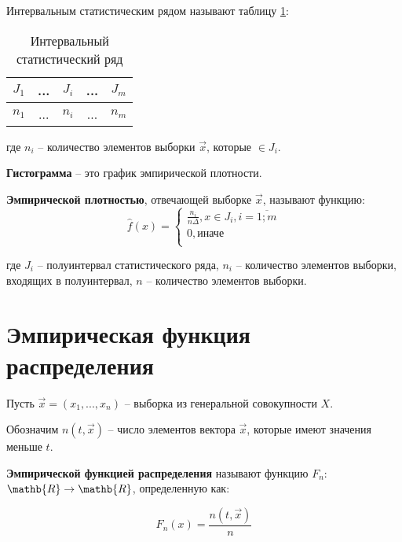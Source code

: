 Интервальным статистическим рядом называют таблицу \ref{table:row1}:

\begin{table}[ht!]
	\captionsetup{singlelinecheck = false, justification=raggedleft}
	\caption{Интервальный статистический ряд}
	\centering
	\label{table:row1}
	\begin{tabular}{|c|c|c|c|c|}
		\hline
		$J_1$ & ... & $J_i$ & ... & $J_m$ \\
		\hline
		$n_1$ & ... & $n_i$ & ... & $n_m$ \\
		\hline
	\end{tabular}
\end{table}

где $n_i$ -- количество элементов выборки $\vec x$, которые $\in J_i$.

\textbf{Гистограмма} -- это график эмпирической плотности. 

\textbf{Эмпирической плотностью}, отвечающей выборке $\vec x$, называют функцию:
\begin{equation}
	\hat f(x) =
	\begin{cases}
		\frac{n_i}{n \Delta}, x \in J_i, i = \overline{1; m} \\
		0, \text{иначе} \\
	\end{cases}
\end{equation}

где $J_i$ -- полуинтервал статистического ряда, 
$n_i$ -- количество элементов выборки, входящих в полуинтервал, 
$n$ -- количество элементов выборки.


\section{Эмпирическая функция распределения}

Пусть $\vec x = (x_1, ..., x_n)$ -- выборка из генеральной совокупности $X$. 

Обозначим $n(t, \vec x)$ -- число элементов вектора $\vec x$, которые имеют значения меньше $t$.

\textbf{Эмпирической функцией распределения} называют функцию \newline
$F_n:$ $\mathb{R} \to \mathb{R}$, определенную как: 

\begin{equation}
	F_n(x) = \frac{n(t, \vec x)}{n}
\end{equation}
